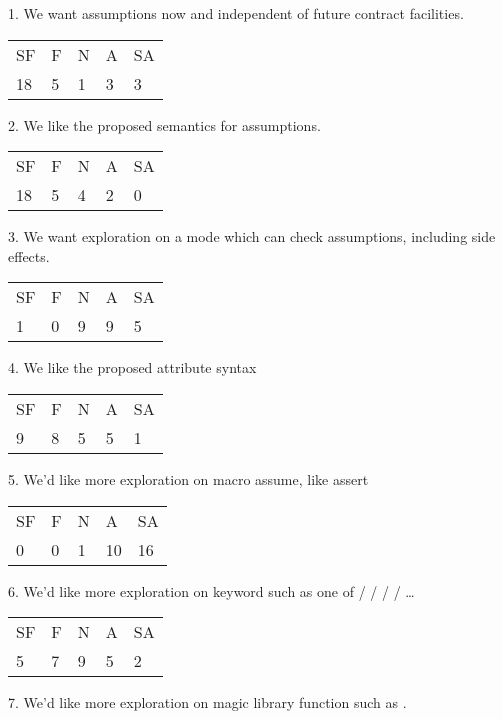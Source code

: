 1. We want assumptions now and independent of future contract facilities.

\hspace{6mm}
\begin{tabular}{lllll}
SF & F & N & A & SA \\
18 & 5 & 1 & 3 & 3
\end{tabular}

2. We like the proposed semantics for assumptions.

\hspace{6mm}
\begin{tabular}{lllll}
SF & F & N & A & SA \\
18 & 5 & 4 & 2 & 0
\end{tabular}

3. We want exploration on a mode which can check assumptions, including side effects.

\hspace{6mm}
\begin{tabular}{lllll}
SF & F & N & A & SA \\
1 & 0 & 9 & 9 & 5
\end{tabular}

4. We like the proposed attribute syntax 

\hspace{6mm}
\begin{tabular}{lllll}
SF & F & N & A & SA \\
9 & 8 & 5 & 5 & 1
\end{tabular}

5. We’d like more exploration on macro assume, like assert

\hspace{6mm}
\begin{tabular}{lllll}
SF & F & N & A & SA \\
0 & 0 & 1 & 10 & 16
\end{tabular}

6. We’d like more exploration on keyword such as one of  /  /  /  / …

\hspace{6mm}
\begin{tabular}{lllll}
SF & F & N & A & SA \\
5 & 7 & 9 & 5 & 2
\end{tabular}

7. We’d like more exploration on magic library function such as .

